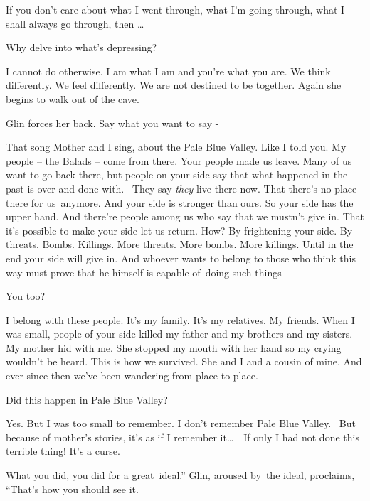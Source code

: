 \documentclass[twoside,11pt]{book}
\begin{document}
{\textquotedbl}If you don't care about what I went through, what I'm going through, what I shall always go through, then
{\dots}{\textquotedbl} 

{\textquotedbl}Why delve into what's depressing?{\textquotedbl} 

{\textquotedbl}I cannot do otherwise. I am what I am and you're what you are. We think differently. We feel differently.
We are not destined to be together.{\textquotedbl} Again she begins to walk out of the cave. 

Glin forces her back. {\textquotedbl}Say what you want to say -{\textquotedbl} 

{\textquotedbl}That song Mother and I sing, about the Pale Blue Valley. Like I told you. My people -- the Balads -- come
from there. Your people made us leave. Many of us want to go back there, but people on your side say that what happened
in the past is over and done with. ~They say \textit{they }live there now. That there's no place there for us~anymore.
And your side is stronger than ours. So your side has the upper hand. And there're people among us who say that we
mustn't give in. That it's possible to make your side let us return. How? By frightening your side. By threats. Bombs.
Killings. More threats. More bombs. More killings. Until in the end your side will give in. And whoever wants to belong
to those who think this way must prove that he himself is capable of~doing such things --{\textquotedbl} 

{\textquotedbl}You too?{\textquotedbl} 

{\textquotedbl}I belong with these people. It's my family. It's my relatives. My friends. When I was small, people of
your side killed my father and my brothers and my sisters. My mother hid with me. She stopped my mouth with her hand so
my crying wouldn't be heard. This is how we survived. She and I and a cousin of mine. And ever since then we've been
wandering from place to place.{\textquotedbl} 

{\textquotedbl}Did this happen in Pale Blue Valley?{\textquotedbl} 

{\textquotedbl}Yes. But I was too small to remember. I don't remember Pale Blue Valley. ~But because of mother's
stories, it's as if I remember it{\dots}\ \ If only I had not done this terrible thing! It's a curse.{\textquotedbl} 

{\textquotedbl}What you did, you did for a great~ideal.'' Glin, aroused by{\ }the ideal, proclaims,
``That's how you should see it.{\textquotedbl} 
\end{document}
